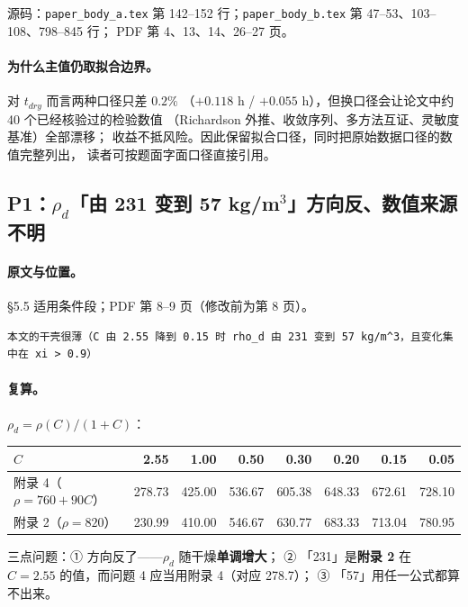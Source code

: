 \documentclass[11pt,a4paper]{ctexart}
\newcommand{\src}[1]{\texttt{#1}}
\newcommand{\loc}[1]{\textcolor{blue!60!black}{#1}}
\begin{document}
\loc{源码：\src{paper\_body\_a.tex} 第 142--152 行；\src{paper\_body\_b.tex} 第 47--53、103--108、798--845 行；
PDF 第 4、13、14、26--27 页}。

\paragraph{为什么主值仍取拟合边界。}对 $t_{dry}$ 而言两种口径只差 $0.2\%$
（$+0.118$ h / $+0.055$ h），但换口径会让论文中约 40 个已经核验过的检验数值
（Richardson 外推、收敛序列、多方法互证、灵敏度基准）全部漂移；
收益不抵风险。因此保留拟合口径，同时把原始数据口径的数值完整列出，
读者可按题面字面口径直接引用。

\subsection{P1：$\rho_d$「由 231 变到 57 kg/m$^3$」方向反、数值来源不明}

\paragraph{原文与位置。}\loc{§5.5 适用条件段；PDF 第 8--9 页（修改前为第 8 页）}。

\begin{lstlisting}[style=old]
本文的干壳很薄（C 由 2.55 降到 0.15 时 rho_d 由 231 变到 57 kg/m^3，且变化集中在 xi > 0.9）
\end{lstlisting}

\paragraph{复算。}$\rho_d=\rho(C)/(1+C)$：

\begin{center}
\small
\begin{tabular}{@{}lrrrrrrr@{}}
\toprule
$C$ & 2.55 & 1.00 & 0.50 & 0.30 & 0.20 & 0.15 & 0.05 \\
\midrule
附录 4（$\rho=760+90C$） & 278.73 & 425.00 & 536.67 & 605.38 & 648.33 & 672.61 & 728.10 \\
附录 2（$\rho=820$） & 230.99 & 410.00 & 546.67 & 630.77 & 683.33 & 713.04 & 780.95 \\
\bottomrule
\end{tabular}
\end{center}

\noindent 三点问题：① 方向反了——$\rho_d$ 随干燥\textbf{单调增大}；
② 「231」是\textbf{附录 2} 在 $C=2.55$ 的值，而问题 4 应当用附录 4（对应 278.7）；
③ 「57」用任一公式都算不出来。
\end{document}
